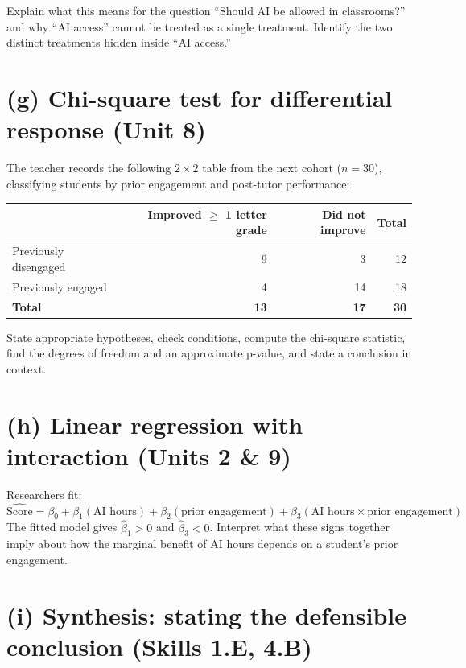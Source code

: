 \documentclass[11pt]{article}
\begin{document}
Explain what this means for the question ``Should AI be allowed in
classrooms?'' and why ``AI access'' cannot be treated as a single
treatment. Identify the two distinct treatments hidden inside ``AI
access.''

\section{(g) Chi-square test for differential response \textnormal{\small(Unit 8)}}

The teacher records the following $2 \times 2$ table from the next
cohort ($n = 30$), classifying students by prior engagement and
post-tutor performance:

\begin{center}
\small
\begin{tabular}{lrrr}
\toprule
 & Improved $\geq$ 1 letter grade & Did not improve & Total \\
\midrule
Previously disengaged & 9 & 3  & 12 \\
Previously engaged    & 4 & 14 & 18 \\
\midrule
\textbf{Total}        & \textbf{13} & \textbf{17} & \textbf{30} \\
\bottomrule
\end{tabular}
\end{center}

State appropriate hypotheses, check conditions, compute the
chi-square statistic, find the degrees of freedom and an approximate
p-value, and state a conclusion in context.

\section{(h) Linear regression with interaction \textnormal{\small(Units 2 \& 9)}}

Researchers fit:
\[
\widehat{\text{Score}} = \beta_0 + \beta_1(\text{AI hours})
  + \beta_2(\text{prior engagement})
  + \beta_3(\text{AI hours} \times \text{prior engagement})
\]
The fitted model gives $\hat\beta_1 > 0$ and $\hat\beta_3 < 0$.
Interpret what these signs together imply about how the marginal
benefit of AI hours depends on a student's prior engagement.

\section{(i) Synthesis: stating the defensible conclusion \textnormal{\small(Skills 1.E, 4.B)}}
\end{document}
